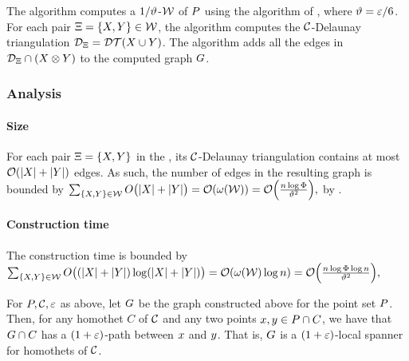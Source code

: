 \documentclass[12pt]{article}%
\begin{document}
The algorithm computes a $1/\vartheta$-\WSPD $\mathcal{W}$ of $P$ using the
algorithm of , where $\vartheta = \varepsilon/6$.  For
each pair $\Xi = \{X, Y \} \in \mathcal{W}$, the algorithm computes
the $\mathcal{C}$-Delaunay triangulation
$\DT_{\Pair} = \DTX{ \PSX \cup \PSY}$. The algorithm adds all the
edges in $\mathcal{D}_{\Xi} \cap (X \otimes Y)$ to the computed graph
$G$.

\subsubsection{Analysis}

\paragraph{Size}

For each pair $\Xi = \{X, Y\}$ in the \WSPD, its
$\mathcal{C}$-Delaunay triangulation contains at most $\mathcal{O}( |X| + |Y|)$
edges. As such, the number of edges in the resulting graph is bounded
by
\begin{math}
    \sum_{\{\PSX, \PSY\} \in \WS} O\bigl( |\PSX| + |\PSY| \bigr) =%
    \Of\pth{ \WeightX{\WS} }%
    =%
    \Of\pth{ \frac{n\log \spread}{{\epsA}^{2}}},
\end{math}
by .


\paragraph{Construction time}
The construction time is bounded by
\begin{math}
    \sum_{\{\PSX, \PSY\} \in \WS} O\bigl( (|\PSX| + |\PSY|) \log
    (|\PSX| + |\PSY|)  \bigr)
    =%
    \Of\pth{ \WeightX{\WS} \log n }%
    =%
    \Of\pth{ \frac{n\log \spread \log n}{{\epsA}^{2}}},    
\end{math}

\begin{lemma}
    For $P, \mathcal{C}, \varepsilon$ as above, let $G$ be the graph constructed
    above for the point set $P$. Then, for any homothet $C$ of $\mathcal{C}$
    and any two points $x, y \in P \cap C$, we have that
    $G \cap {C}$ has a $(1+\varepsilon)$-path between $x$ and
    $y$. That is, $G$ is a $(1+\varepsilon)$-local spanner for homothets
    of $\mathcal{C}$.
\end{lemma}
\end{document}
